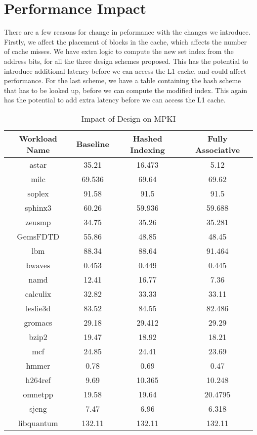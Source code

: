 \section{Performance Impact}
There are a few reasons for change in peformance with the changes we introduce. Firstly, we affect the placement of blocks in the cache, which affects the number of cache misses. We have extra logic to compute the new set index from the address bits, for all the three design schemes proposed. This has the potential to introduce additional latency before we can access the L1 cache, and could affect performance. For the last scheme, we have a table containing the hash scheme that has to be looked up, before we can compute the modified index. This again has the potential to add extra latency before we can access the L1 cache.   

\begin{table}[h]
	\caption {Impact of Design on MPKI}
	\begin{tabular}{|c||c||c||c|}
	      \hline
	      Workload Name & Baseline & Hashed Indexing & Fully Associative\\
	      \hline
		astar & 35.21 & 16.473 & 5.12\\
	      \hline
		milc & 69.536 & 69.64 & 69.62\\
	      \hline
		soplex & 91.58 & 91.5 & 91.5 \\ 
	      \hline
		sphinx3 & 60.26 & 59.936 & 59.688\\
	      \hline
		zeusmp & 34.75 & 35.26 & 35.281\\
	      \hline
		GemsFDTD & 55.86 & 48.85 & 48.45\\
	      \hline
		lbm & 88.34 & 88.64 & 91.464\\
	      \hline
		bwaves & 0.453 & 0.449 & 0.445\\
	      \hline 
		namd & 12.41 & 16.77 & 7.36\\
	      \hline
		calculix & 32.82 & 33.33 & 33.11\\
	      \hline
		leslie3d & 83.52 & 84.55 & 82.486\\
	      \hline
		gromacs & 29.18 & 29.412 & 29.29\\
	      \hline
		bzip2 & 19.47 & 18.92 & 18.21\\
	      \hline
		mcf & 24.85 & 24.41 & 23.69\\
	      \hline
		hmmer & 0.78 & 0.69 & 0.47\\
	      \hline
		h264ref & 9.69 & 10.365 & 10.248\\
	      \hline
		omnetpp & 19.58 & 19.64 & 20.4795\\
	      \hline 
		sjeng & 7.47 & 6.96 & 6.318\\
	      \hline
		libquantum & 132.11 & 132.11 & 132.11\\
	      \hline
	  \end{tabular}
\end{table}

